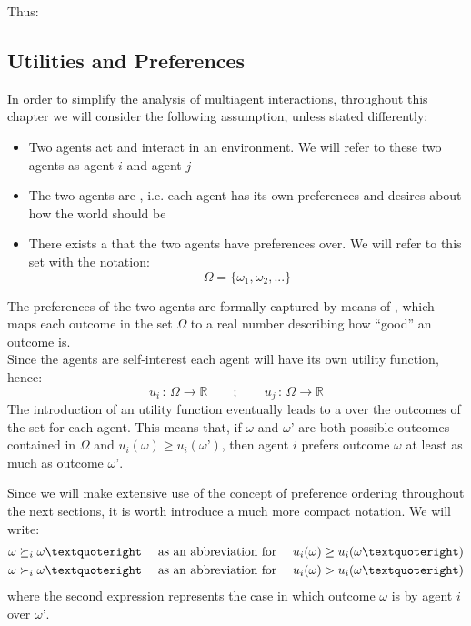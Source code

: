 	Thus:\\

\subsection{Utilities and Preferences}
In order to simplify the analysis of multiagent interactions, throughout this chapter we will consider the following assumption, unless stated differently:
	\begin{itemize}
	\item Two agents act and interact in an environment. We will refer to these two agents as agent $i$ and agent $j$
	\item The two agents are , i.e. each agent has its own preferences and desires about how the world should be
	\item There exists a  that the two agents have preferences over. We will refer to this set with the notation:
	\[\Omega = \{\omega_1, \omega_2,...\}\]
	\end{itemize}
	
	The preferences of the two agents are formally captured by means of , which maps each outcome in the set $\Omega$ to a real number describing how “good” an outcome is.\\
	Since the agents are self-interest each agent will have its own utility function, hence:
	\[u_i\,:\,\Omega\rightarrow\mathbb{R}\qquad;\qquad u_j\,:\,\Omega\rightarrow\mathbb{R}\]
	The introduction of an utility function eventually leads to a  over the outcomes of the set for each agent.
	This means that, if $\omega$ and $\omega’$ are both possible outcomes contained in $\Omega$ and $u_i(\omega)\ge u_i(\omega’)$, then agent $i$ prefers outcome $\omega$ at least as much as outcome $\omega’$.
	
	Since we will make extensive use of the concept of preference ordering throughout the next sections, it is worth introduce a much more compact notation. We will write:
	\begin{align*}
	\omega \cge_i \omega’ &&\text{ as an abbreviation for } && u_i(\omega) \ge u_i(\omega’)\\
	\omega \cmore_i \omega’ &&\text{ as an abbreviation for } && u_i(\omega) > u_i(\omega’)
	\end{align*}
	where the second expression represents the case in which outcome $\omega$ is  by agent $i$ over $\omega’$.
	
